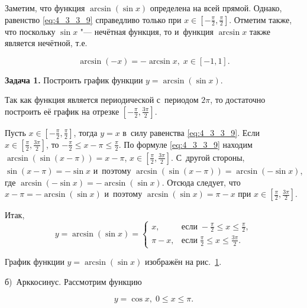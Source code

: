 Заметим, что функция $\arcsin (\sin x)$ определена на всей прямой.
Однако, равенство \eqref{eq:4_3_3_9} справедливо только при
$\displaystyle x \in \left[ -\frac{\pi}{2}, \frac{\pi}{2} \right]$.
Отметим также, что поскольку $\sin x$ "--- нечётная функция, то и~функция $\arcsin x$
также является нечётной, т.е.\

\begin{equation}\label{eq:4_3_3_10}
\arcsin (-x) = -\arcsin x, \; x \in [-1, 1].
\end{equation}

\textbf{Задача 1.}\label{ex:4_3_3_1} Построить график функции $y = \arcsin (\sin x)$.

Так как функция является периодической с~периодом $2\pi$, то достаточно построить её
график на отрезке $\displaystyle \left[ -\frac{\pi}{2}, \frac{3\pi}{2} \right]$.

Пусть $\displaystyle x \in \left[ -\frac{\pi}{2}, \frac{\pi}{2} \right]$,
тогда $y = x$ в~силу равенства \eqref{eq:4_3_3_9}.
Если $\displaystyle x \in \left[ \frac{\pi}{2}, \frac{3\pi}{2} \right]$,
то $\displaystyle -\frac{\pi}{2} \leqslant x - \pi \leqslant \frac{\pi}{2}$.
По формуле \eqref{eq:4_3_3_9} находим
$\arcsin (\sin (x - \pi)) = x - \pi$,
$\displaystyle x \in \left[ \frac{\pi}{2}, \frac{3\pi}{2} \right]$.
С~другой стороны, $\sin (x - \pi) = -\sin x$
и~поэтому $\arcsin (\sin (x - \pi)) = \arcsin (-\sin x)$, где
$\arcsin (-\sin x) = -\arcsin (\sin x)$. Отсюда следует, что
$x - \pi = -\arcsin (\sin x)$ и~поэтому
$\arcsin (\sin x) = \pi - x$ при $\displaystyle x \in \left[ \frac{\pi}{2}, \frac{3\pi}{2} \right]$.

Итак,
\begin{equation*}
y = \arcsin (\sin x) =
\begin{cases}
x, &\text{если} \; \displaystyle -\frac{\pi}{2} \leqslant x \leqslant \frac{\pi}{2}, \\
\pi - x, &\text{если} \; \displaystyle \frac{\pi}{2} \leqslant x \leqslant \frac{3\pi}{2}.
\end{cases}
\end{equation*}

График функции $y = \arcsin (\sin x)$ изображён на рис.\ \ref{fig:4_3_3_13}.

\begin{figure}\label{fig:4_3_3_13}
\end{figure}

б)~Арккосинус.\label{pst:4_3_3_2} Рассмотрим функцию

\begin{equation}\label{eq:4_3_3_11}
y = \cos x, \; 0 \leqslant x \leqslant \pi.
\end{equation}

